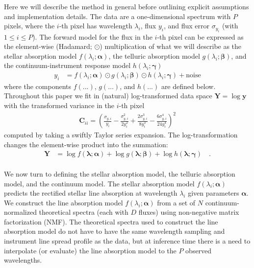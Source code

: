 \documentclass[modern]{aastex631}
\renewcommand{\vec}[1]{\mathbf{#1}}
\newcommand{\vecalpha}{\boldsymbol{\alpha}}
\newcommand{\vecbeta}{\boldsymbol{\beta}}
\newcommand{\vecgamma}{\boldsymbol{\gamma}}
\newcommand{\hadamard}{\odot}
\begin{document}
Here we will describe the method in general before outlining explicit assumptions and implementation details. The data are a one-dimensional spectrum with $P$ pixels, where the $i$-th pixel has wavelength $\lambda_i$, flux $y_i$, and flux error $\sigma_{y_i}$ (with $1 \leq i \leq P$). The forward model for the flux in the $i$-th pixel can be expressed as the element-wise (Hadamard; $\hadamard$) multiplication of what we will describe as the stellar absorption model $f(\lambda_i; \vecalpha)$, the telluric absorption model $g(\lambda_i; \vecbeta)$, and the continuum-instrument response model $h(\lambda_i;\vecgamma)$
\begin{align}
    y_i &= f(\lambda_i;\vecalpha)\hadamard{}g(\lambda_i;\vecbeta)\hadamard{}h(\lambda_i;\vecgamma) + \mbox{noise}
\end{align}
where the components $f(...)$, $g(...)$, and $h(...)$ are defined below. Throughout this paper we fit in (natural) log-transformed data space $\vec{Y} = \log{\vec{y}}$ with the transformed variance in the $i$-th pixel
\begin{eqnarray}
    \vec{C}_{ii} = \left(\frac{\sigma_{y,i}}{y_i} - \frac{\sigma_{y,i}^2}{2y_i^2} + \frac{2\sigma_{y,i}^3}{8y_i^3} - \frac{6\sigma_{y,i}^4}{24y_i^4}\right)^2
\end{eqnarray}
\noindent{}computed by taking a swiftly Taylor series expansion. The log-transformation changes the element-wise product into the summation:
\begin{align}
    \label{eq:log_y}
    \vec{Y} &= \log{f(\vec{\lambda}; \vecalpha)} + \log{g(\vec{\lambda};\vecbeta)} + \log{h(\vec{\lambda};\vecgamma)} \quad .
\end{align}\\

We now turn to defining the stellar absorption model, the telluric absorption model, and the continuum model.
The stellar absorption model $f(\lambda_i;\vecalpha)$ predicts the rectified stellar line absorption at wavelength $\lambda_i$ given parameters $\vecalpha$. We construct the line absorption model $f(\lambda_i;\vecalpha)$ from a set of $N$ continuum-normalized theoretical spectra (each with $D$ fluxes) using non-negative matrix factorization (NMF). 
The theoretical spectra used to construct  the line absorption model do not have to have the same wavelength sampling and instrument line spread profile as the data, but at inference time there is a need to interpolate (or evaluate) the line absorption model to the $P$ observed wavelengths.\\
\end{document}
